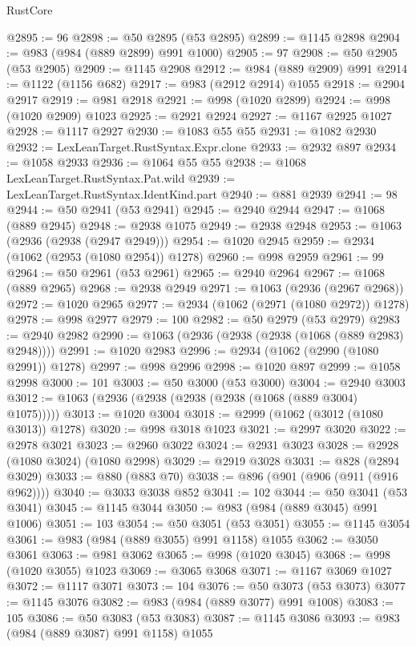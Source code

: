 \begin{lexlean}{RustCore}
\begin{coremodule}
@2895 := 96
@2898 := @50 @2895 (@53 @2895)
@2899 := @1145 @2898
@2904 := @983 (@984 (@889 @2899) @991 @1000)
@2905 := 97
@2908 := @50 @2905 (@53 @2905)
@2909 := @1145 @2908
@2912 := @984 (@889 @2909) @991
@2914 := @1122 (@1156 @682)
@2917 := @983 (@2912 @2914) @1055
@2918 := @2904 @2917
@2919 := @981 @2918
@2921 := @998 (@1020 @2899)
@2924 := @998 (@1020 @2909) @1023
@2925 := @2921 @2924
@2927 := @1167 @2925 @1027
@2928 := @1117 @2927
@2930 := @1083 @55 @55
@2931 := @1082 @2930
@2932 := LexLeanTarget.RustSyntax.Expr.clone
@2933 := @2932 @897
@2934 := @1058 @2933
@2936 := @1064 @55 @55
@2938 := @1068 LexLeanTarget.RustSyntax.Pat.wild
@2939 := LexLeanTarget.RustSyntax.IdentKind.part
@2940 := @881 @2939
@2941 := 98
@2944 := @50 @2941 (@53 @2941)
@2945 := @2940 @2944
@2947 := @1068 (@889 @2945)
@2948 := @2938 @1075
@2949 := @2938 @2948
@2953 := @1063 (@2936 (@2938 (@2947 @2949)))
@2954 := @1020 @2945
@2959 := @2934 (@1062 (@2953 (@1080 @2954)) @1278)
@2960 := @998 @2959
@2961 := 99
@2964 := @50 @2961 (@53 @2961)
@2965 := @2940 @2964
@2967 := @1068 (@889 @2965)
@2968 := @2938 @2949
@2971 := @1063 (@2936 (@2967 @2968))
@2972 := @1020 @2965
@2977 := @2934 (@1062 (@2971 (@1080 @2972)) @1278)
@2978 := @998 @2977
@2979 := 100
@2982 := @50 @2979 (@53 @2979)
@2983 := @2940 @2982
@2990 := @1063 (@2936 (@2938 (@2938 (@1068 (@889 @2983) @2948))))
@2991 := @1020 @2983
@2996 := @2934 (@1062 (@2990 (@1080 @2991)) @1278)
@2997 := @998 @2996
@2998 := @1020 @897
@2999 := @1058 @2998
@3000 := 101
@3003 := @50 @3000 (@53 @3000)
@3004 := @2940 @3003
@3012 := @1063 (@2936 (@2938 (@2938 (@2938 (@1068 (@889 @3004) @1075)))))
@3013 := @1020 @3004
@3018 := @2999 (@1062 (@3012 (@1080 @3013)) @1278)
@3020 := @998 @3018 @1023
@3021 := @2997 @3020
@3022 := @2978 @3021
@3023 := @2960 @3022
@3024 := @2931 @3023
@3028 := @2928 (@1080 @3024) (@1080 @2998)
@3029 := @2919 @3028
@3031 := @828 (@2894 @3029)
@3033 := @880 (@883 @70)
@3038 := @896 (@901 (@906 (@911 (@916 @962))))
@3040 := @3033 @3038 @852
@3041 := 102
@3044 := @50 @3041 (@53 @3041)
@3045 := @1145 @3044
@3050 := @983 (@984 (@889 @3045) @991 @1006)
@3051 := 103
@3054 := @50 @3051 (@53 @3051)
@3055 := @1145 @3054
@3061 := @983 (@984 (@889 @3055) @991 @1158) @1055
@3062 := @3050 @3061
@3063 := @981 @3062
@3065 := @998 (@1020 @3045)
@3068 := @998 (@1020 @3055) @1023
@3069 := @3065 @3068
@3071 := @1167 @3069 @1027
@3072 := @1117 @3071
@3073 := 104
@3076 := @50 @3073 (@53 @3073)
@3077 := @1145 @3076
@3082 := @983 (@984 (@889 @3077) @991 @1008)
@3083 := 105
@3086 := @50 @3083 (@53 @3083)
@3087 := @1145 @3086
@3093 := @983 (@984 (@889 @3087) @991 @1158) @1055

\end{coremodule}
\end{lexlean}
